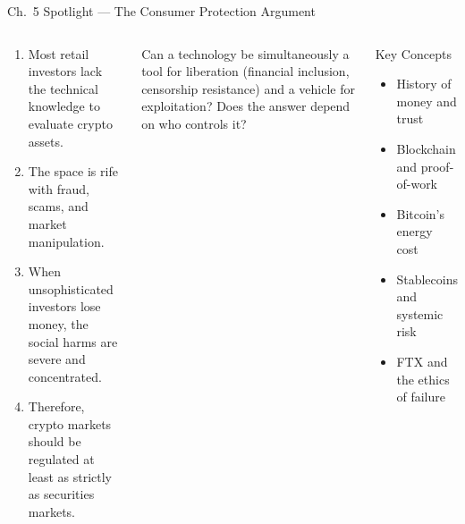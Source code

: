 \documentclass[aspectratio=169,10pt]{beamer}
\begin{document}
\begin{frame}[shrink=5]{Ch.~5 Spotlight --- The Consumer Protection Argument}
\begin{columns}[c]
\begin{argumentbox}
\footnotesize
\begin{enumerate}
  \item Most retail investors lack the technical knowledge to evaluate crypto assets.
  \item The space is rife with fraud, scams, and market manipulation.
  \item When unsophisticated investors lose money, the social harms are severe and concentrated.
  \item Therefore, crypto markets should be regulated at least as strictly as securities markets.
\end{enumerate}
\end{argumentbox}
\vspace{0.25em}
\begin{discussionbox}
\footnotesize Can a technology be simultaneously a tool for liberation (financial inclusion, censorship resistance) and a vehicle for exploitation? Does the answer depend on who controls it?
\end{discussionbox}
\begin{block}{Key Concepts}
\footnotesize
\begin{itemize}
  \item History of money and trust
  \item Blockchain and proof-of-work
  \item Bitcoin's energy cost
  \item Stablecoins and systemic risk
  \item FTX and the ethics of failure
\end{itemize}
\end{block}
\end{columns}
\end{frame}
\end{document}
